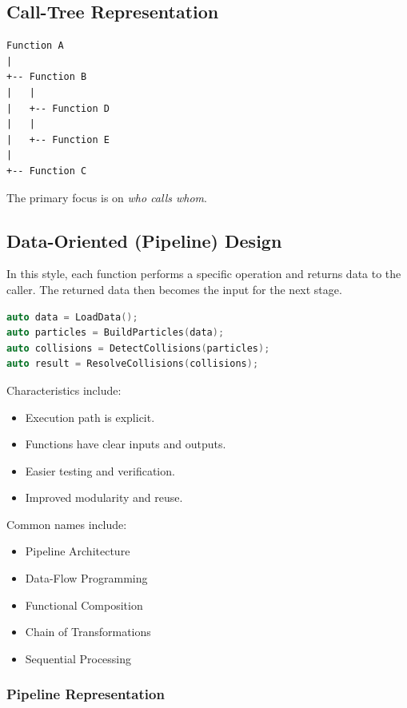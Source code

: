 \subsection*{Call-Tree Representation}

\begin{verbatim}
Function A
|
+-- Function B
|   |
|   +-- Function D
|   |
|   +-- Function E
|
+-- Function C
\end{verbatim}

The primary focus is on \emph{who calls whom}.

\subsection{Data-Oriented (Pipeline) Design}

In this style, each function performs a specific operation and returns data to the caller. The returned data then becomes the input for the next stage.

\begin{lstlisting}[language=C++]
auto data = LoadData();
auto particles = BuildParticles(data);
auto collisions = DetectCollisions(particles);
auto result = ResolveCollisions(collisions);
\end{lstlisting}

Characteristics include:

\begin{itemize}
\item Execution path is explicit.
\item Functions have clear inputs and outputs.
\item Easier testing and verification.
\item Improved modularity and reuse.
\end{itemize}

Common names include:

\begin{itemize}
\item Pipeline Architecture
\item Data-Flow Programming
\item Functional Composition
\item Chain of Transformations
\item Sequential Processing
\end{itemize}

\subsubsection*{Pipeline Representation}

